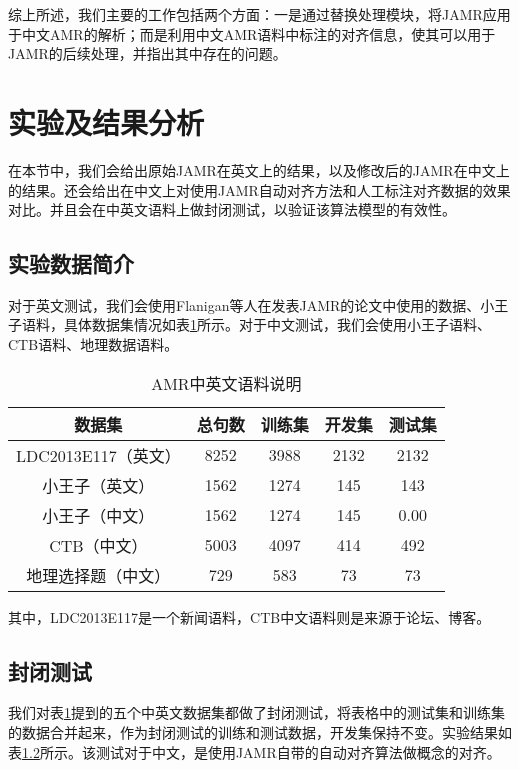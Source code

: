 \documentclass[master, winfont]{njuthesis}
\begin{document}
综上所述，我们主要的工作包括两个方面：一是通过替换处理模块，将JAMR应用于中文AMR的解析；而是利用中文AMR语料中标注的对齐信息，使其可以用于JAMR的后续处理，并指出其中存在的问题。

\section{实验及结果分析}
在本节中，我们会给出原始JAMR在英文上的结果，以及修改后的JAMR在中文上的结果。还会给出在中文上对使用JAMR自动对齐方法和人工标注对齐数据的效果对比。并且会在中英文语料上做封闭测试，以验证该算法模型的有效性。

\subsection{实验数据简介}
对于英文测试，我们会使用Flanigan等人\cite{Flanigan2014}在发表JAMR的论文中使用的数据、小王子语料，具体数据集情况如表\ref{table:amrdatas}所示。对于中文测试，我们会使用小王子语料、CTB语料、地理数据语料。

\begin{table}
\begin{center}
\begin{tabular}{c|c|c|c|c}
\hline {数据集} & {总句数} & {训练集} & {开发集} & {测试集} \\
\hline LDC2013E117（英文） & 8252 & 3988 & 2132 & 2132 \\
\hline 小王子（英文） & 1562 & 1274 & 145 & 143 \\
\hline 小王子（中文） & 1562 & 1274 & 145 & 0.00 \\
\hline CTB（中文） & 5003 & 4097 & 414 & 492 \\
\hline 地理选择题（中文） & 729 & 583 & 73 & 73 \\
\hline
\end{tabular}
\end{center}
\caption{\label{table:amrdatas} AMR中英文语料说明}
\end{table}

其中，LDC2013E117是一个新闻语料，CTB中文语料则是来源于论坛、博客。

\subsection{封闭测试}
我们对表\ref{table:amrdatas}提到的五个中英文数据集都做了封闭测试，将表格中的测试集和训练集的数据合并起来，作为封闭测试的训练和测试数据，开发集保持不变。实验结果如表\ref{}所示。该测试对于中文，是使用JAMR自带的自动对齐算法做概念的对齐。
\end{document}

